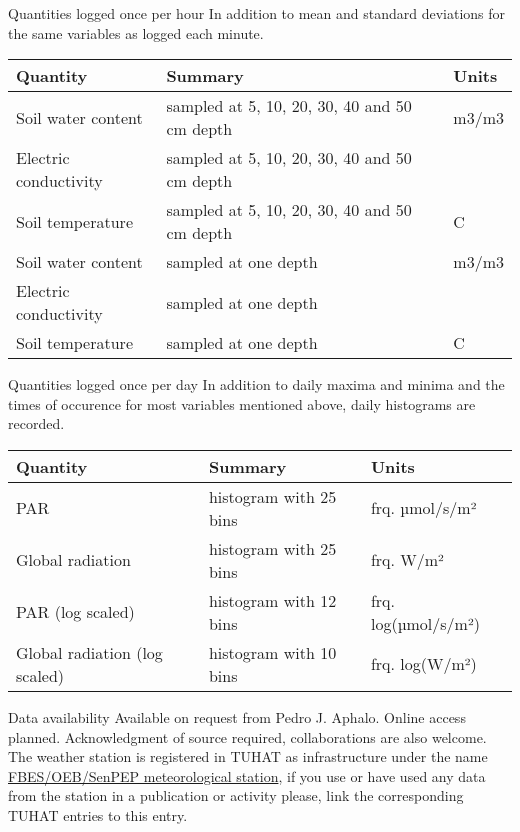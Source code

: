 \documentclass[
  ignorenonframetext,
]{beamer}
\begin{document}
\begin{frame}{Quantities logged once per hour}
\protect\hypertarget{quantities-logged-once-per-hour}{}
In addition to mean and standard deviations for the same variables as
logged each minute.

\begin{longtable}[]{@{}lll@{}}
\toprule
Quantity & Summary & Units \\
\midrule
\endhead
Soil water content & sampled at 5, 10, 20, 30, 40 and 50 cm depth &
m3/m3 \\
Electric conductivity & sampled at 5, 10, 20, 30, 40 and 50 cm depth
& \\
Soil temperature & sampled at 5, 10, 20, 30, 40 and 50 cm depth & C \\
Soil water content & sampled at one depth & m3/m3 \\
Electric conductivity & sampled at one depth & \\
Soil temperature & sampled at one depth & C \\
\bottomrule
\end{longtable}
\end{frame}

\begin{frame}{Quantities logged once per day}
\protect\hypertarget{quantities-logged-once-per-day}{}
In addition to daily maxima and minima and the times of occurence for
most variables mentioned above, daily histograms are recorded.

\begin{longtable}[]{@{}lll@{}}
\toprule
Quantity & Summary & Units \\
\midrule
\endhead
PAR & histogram with 25 bins & frq. µmol/s/m² \\
Global radiation & histogram with 25 bins & frq. W/m² \\
PAR (log scaled) & histogram with 12 bins & frq. log(µmol/s/m²) \\
Global radiation (log scaled) & histogram with 10 bins & frq.
log(W/m²) \\
\bottomrule
\end{longtable}
\end{frame}

\begin{frame}{Data availability}
\protect\hypertarget{data-availability}{}
Available on request from Pedro J. Aphalo. Online access planned.
Acknowledgment of source required, collaborations are also welcome. The
weather station is registered in TUHAT as infrastructure under the name
\href{https://tuhat.helsinki.fi/admin/editor/dk/atira/pure/api/shared/model/equipment/editor/equipmenteditor.xhtml?id=159814768}{FBES/OEB/SenPEP
meteorological station}, if you use or have used any data from the
station in a publication or activity please, link the corresponding
TUHAT entries to this entry.
\end{frame}
\end{document}
